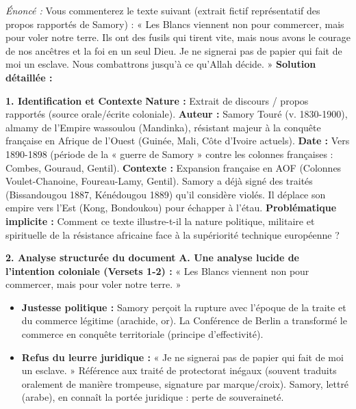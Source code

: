 \documentclass[11pt]{article}
\newcommand{\cle}[1]{{\popxbold\color{popdark}#1}}
\begin{document}
\begin{exoresolu}
\emph{Énoncé :} Vous commenterez le texte suivant (extrait fictif représentatif des propos rapportés de Samory) : « Les Blancs viennent non pour commercer, mais pour voler notre terre. Ils ont des fusils qui tirent vite, mais nous avons le courage de nos ancêtres et la foi en un seul Dieu. Je ne signerai pas de papier qui fait de moi un esclave. Nous combattrons jusqu'à ce qu'Allah décide. »
\tcblower
\textbf{Solution détaillée :}

\textbf{1. Identification et Contexte}
\textbf{Nature :} Extrait de discours / propos rapportés (source orale/écrite coloniale).
\textbf{Auteur :} \cle{Samory Touré} (v. 1830-1900), almamy de l'\cle{Empire wassoulou} (Mandinka), résistant majeur à la conquête française en Afrique de l'Ouest (Guinée, Mali, Côte d'Ivoire actuels).
\textbf{Date :} Vers 1890-1898 (période de la « guerre de Samory » contre les colonnes françaises : Combes, Gouraud, Gentil).
\textbf{Contexte :} Expansion française en AOF (Colonnes Voulet-Chanoine, Foureau-Lamy, Gentil). Samory a déjà signé des traités (Bissandougou 1887, Kénédougou 1889) qu'il considère violés. Il déplace son empire vers l'Est (Kong, Bondoukou) pour échapper à l'étau.
\textbf{Problématique implicite :} Comment ce texte illustre-t-il la nature politique, militaire et spirituelle de la résistance africaine face à la supériorité technique européenne ?

\textbf{2. Analyse structurée du document}
\textbf{A. Une analyse lucide de l'intention coloniale (Versets 1-2) :} « Les Blancs viennent non pour commercer, mais pour voler notre terre. »
\begin{itemize}
    \item \textbf{Justesse politique :} Samory perçoit la rupture avec l'époque de la \cle{traite} et du \cle{commerce légitime} (arachide, or). La \cle{Conférence de Berlin} a transformé le commerce en \cle{conquête territoriale} (principe d'effectivité).
    \item \textbf{Refus du leurre juridique :} « Je ne signerai pas de papier qui fait de moi un esclave. » Référence aux \cle{traité de protectorat} inégaux (souvent traduits oralement de manière trompeuse, signature par marque/croix). Samory, lettré (arabe), en connaît la portée juridique : perte de souveraineté.
\end{itemize}


\end{exoresolu}
\end{document}
